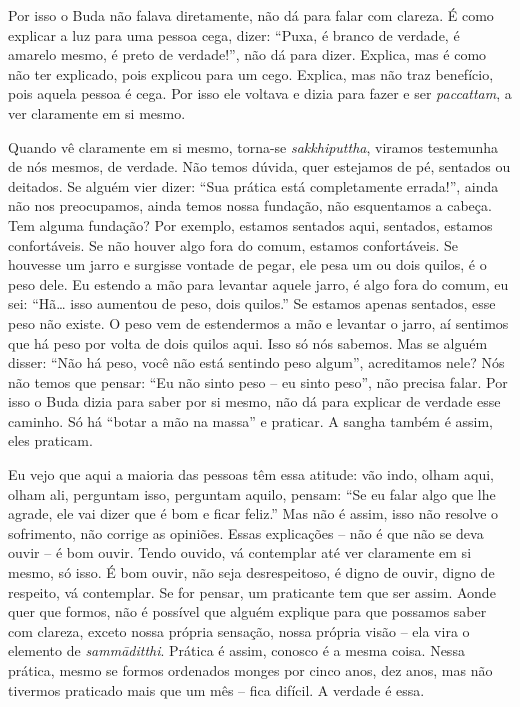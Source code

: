 Por isso o Buda não falava diretamente, não dá para falar com
clareza. É como explicar a luz para uma pessoa cega, dizer: “Puxa, é
branco de verdade, é amarelo mesmo, é preto de verdade!”, não dá para
dizer. Explica, mas é como não ter explicado, pois explicou para um
cego. Explica, mas não traz benefício, pois aquela pessoa é cega. Por
isso ele voltava e dizia para fazer e ser \textit{paccattam}, a ver
claramente em si mesmo. 

Quando vê claramente em si mesmo, torna-se \textit{sakkhiputtha},
viramos testemunha de nós mesmos, de verdade. Não temos dúvida, quer
estejamos de pé, sentados ou deitados. Se alguém vier dizer: “Sua
prática está completamente errada!”, ainda não nos preocupamos, ainda
temos nossa fundação, não esquentamos a cabeça. Tem alguma fundação?
Por exemplo, estamos sentados aqui, sentados, estamos confortáveis. Se
não houver algo fora do comum, estamos confortáveis. Se houvesse um
jarro e surgisse vontade de pegar, ele pesa um ou dois quilos, é o peso
dele. Eu estendo a mão para levantar aquele jarro, é algo fora do
comum, eu sei: “Hã… isso aumentou de peso, dois quilos.” Se estamos
apenas sentados, esse peso não existe. O peso vem de estendermos a mão
e levantar o jarro, aí sentimos que há peso por volta de dois quilos
aqui. Isso só nós sabemos. Mas se alguém disser: “Não há peso, você não
está sentindo peso algum”, acreditamos nele? Nós não temos que pensar:
“Eu não sinto peso – eu sinto peso”, não precisa falar. Por isso o Buda
dizia para saber por si mesmo, não dá para explicar de verdade esse
caminho. Só há “botar a mão na massa” e praticar. A sangha também é
assim, eles praticam.

Eu vejo que aqui a maioria das pessoas têm essa atitude: vão indo,
olham aqui, olham ali, perguntam isso, perguntam aquilo, pensam: “Se eu
falar algo que lhe agrade, ele vai dizer que é bom e ficar feliz.” Mas
não é assim, isso não resolve o sofrimento, não corrige as opiniões.
Essas explicações – não é que não se deva ouvir – é bom ouvir. Tendo
ouvido, vá contemplar até ver claramente em si mesmo, só isso. É bom
ouvir, não seja desrespeitoso, é digno de ouvir, digno de respeito, vá
contemplar. Se for pensar, um praticante tem que ser assim. Aonde quer
que formos, não é possível que alguém explique para que possamos saber
com clareza, exceto nossa própria sensação, nossa própria visão – ela
vira o elemento de \textit{samm\=aditthi}. Prática é assim, conosco é a
mesma coisa. Nessa prática, mesmo se formos ordenados monges por cinco
anos, dez anos, mas não tivermos praticado mais que um mês – fica
difícil. A verdade é essa. 

